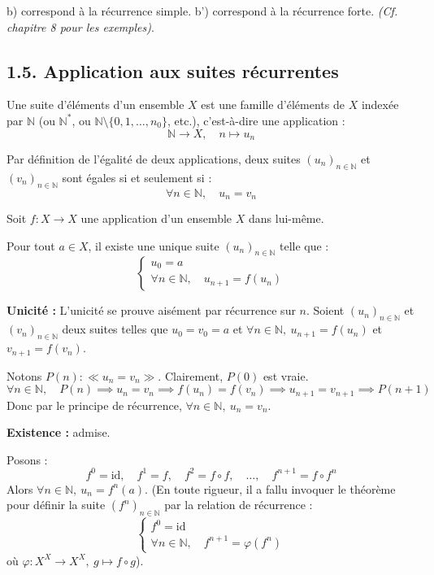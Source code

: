 \documentclass[a4paper,11pt]{article}
\newcommand{\N}{\mathbb{N}}
\begin{document}
\begin{remarque}
b) correspond à la récurrence simple. b') correspond à la récurrence forte. \textit{(Cf. chapitre 8 pour les exemples)}.
\end{remarque}

\subsection{1.5. Application aux suites récurrentes}

\begin{definition}
Une suite d'éléments d'un ensemble $X$ est une famille d'éléments de $X$ indexée par $\N$ (ou $\N^*$, ou $\N \setminus \{0, 1, \dots, n_0\}$, etc.), c'est-à-dire une application :
\[
\N \longrightarrow X, \quad n \longmapsto u_n
\]
\end{definition}

Par définition de l'égalité de deux applications, deux suites $(u_n)_{n \in \N}$ et $(v_n)_{n \in \N}$ sont égales si et seulement si :
\[
\forall n \in \N, \quad u_n = v_n
\]

\begin{theoreme}
Soit $f : X \to X$ une application d'un ensemble $X$ dans lui-même. 

Pour tout $a \in X$, il existe une unique suite $(u_n)_{n \in \N}$ telle que :
\[
\begin{cases}
u_0 = a \\
\forall n \in \N, \quad u_{n+1} = f(u_n)
\end{cases}
\]
\end{theoreme}

\begin{demonstration}
\textbf{Unicité :} L'unicité se prouve aisément par récurrence sur $n$.
Soient $(u_n)_{n \in \N}$ et $(v_n)_{n \in \N}$ deux suites telles que $u_0 = v_0 = a$ et $\forall n \in \N, \ u_{n+1} = f(u_n)$ et $v_{n+1} = f(v_n)$.

Notons $P(n) : \ll u_n = v_n \gg$.
Clairement, $P(0)$ est vraie.
\[
\forall n \in \N, \quad P(n) \implies u_n = v_n \implies f(u_n) = f(v_n) \implies u_{n+1} = v_{n+1} \implies P(n+1)
\]
Donc par le principe de récurrence, $\forall n \in \N, \ u_n = v_n$.

\textbf{Existence :} admise.
\end{demonstration}

\begin{remarque}
Posons :
\[
f^0 = \text{id}, \quad f^1 = f, \quad f^2 = f \circ f, \quad \dots, \quad f^{n+1} = f \circ f^n
\]
Alors $\forall n \in \N, \ u_n = f^n(a)$.
(En toute rigueur, il a fallu invoquer le théorème pour définir la suite $(f^n)_{n \in \N}$ par la relation de récurrence :
\[
\begin{cases}
f^0 = \text{id} \\
\forall n \in \N, \quad f^{n+1} = \varphi(f^n)
\end{cases}
\]
où $\varphi : X^X \to X^X, \ g \mapsto f \circ g$).
\end{remarque}
\end{document}
